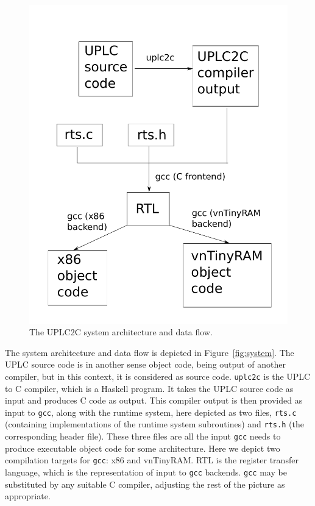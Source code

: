 \documentclass[12pt]{article}
\begin{document}
\begin{figure}
	\includegraphics[width=1.0\columnwidth]{system-and-process-diagram.pdf}
	\caption{The UPLC2C system architecture and data flow.}
\end{figure}

The system architecture and data flow is depicted in Figure~\ref{fig:system}. The UPLC source code is in another sense object code, being output of another compiler, but in this context, it is considered as source code. \texttt{uplc2c} is the UPLC to C compiler, which is a Haskell program. It takes the UPLC source code as input and produces C code as output. This compiler output is then provided as input to \texttt{gcc}, along with the runtime system, here depicted as two files, \texttt{rts.c} (containing implementations of the runtime system subroutines) and \texttt{rts.h} (the corresponding header file). These three files are all the input \texttt{gcc} needs to produce executable object code for some architecture. Here we depict two compilation targets for \texttt{gcc}: x86 and vnTinyRAM. RTL is the register transfer language, which is the representation of input to \texttt{gcc} backends. \cite{rtl} \texttt{gcc} may be substituted by any suitable C compiler, adjusting the rest of the picture as appropriate.
\end{document}
